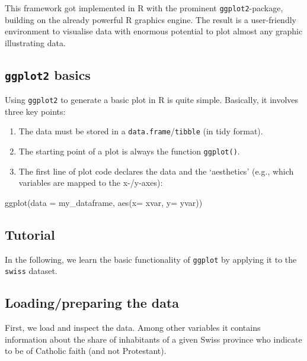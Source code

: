 \documentclass[
  12pt,
]{style/krantz}
\newenvironment{Shaded}{\begin{snugshade}}{\end{snugshade}}
\newcommand{\AttributeTok}[1]{\textcolor[rgb]{0.77,0.63,0.00}{#1}}
\newcommand{\FunctionTok}[1]{\textcolor[rgb]{0.00,0.00,0.00}{#1}}
\newcommand{\NormalTok}[1]{#1}
\providecommand{\tightlist}{%
  \setlength{\itemsep}{0pt}\setlength{\parskip}{0pt}}
\begin{document}
This framework got implemented in R with the prominent \texttt{ggplot2}-package, building on the already powerful R graphics engine. The result is a user-friendly environment to visualise data with enormous potential to plot almost any graphic illustrating data.

\hypertarget{ggplot2-basics}{%
\subsection{\texorpdfstring{\texttt{ggplot2} basics}{ggplot2 basics}}\label{ggplot2-basics}}

Using \texttt{ggplot2} to generate a basic plot in R is quite simple. Basically, it involves three key points:

\begin{enumerate}
\def\labelenumi{\arabic{enumi}.}
\tightlist
\item
  The data must be stored in a \texttt{data.frame}/\texttt{tibble} (in tidy format).
\item
  The starting point of a plot is always the function \texttt{ggplot()}.
\item
  The first line of plot code declares the data and the `aesthetics' (e.g., which variables are mapped to the x-/y-axes):
\end{enumerate}

\begin{Shaded}
\begin{Highlighting}[]
\FunctionTok{ggplot}\NormalTok{(}\AttributeTok{data =}\NormalTok{ my\_dataframe, }\FunctionTok{aes}\NormalTok{(}\AttributeTok{x=}\NormalTok{ xvar, }\AttributeTok{y=}\NormalTok{ yvar))}
\end{Highlighting}
\end{Shaded}

\hypertarget{tutorial}{%
\subsection{Tutorial}\label{tutorial}}

In the following, we learn the basic functionality of \texttt{ggplot} by applying it to the \texttt{swiss} dataset.

\hypertarget{loadingpreparing-the-data}{%
\subsection{Loading/preparing the data}\label{loadingpreparing-the-data}}

First, we load and inspect the data. Among other variables it contains information about the share of inhabitants of a given Swiss province who indicate to be of Catholic faith (and not Protestant).
\end{document}
